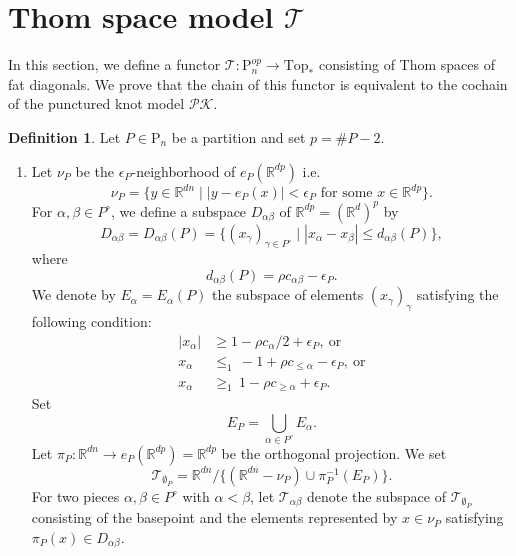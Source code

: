 \documentclass[reqno]{amsart}
\theoremstyle{definition}
\newtheorem{defi}{Definition}[section]
\theoremstyle{plain}
\newcommand{\eps}{\epsilon}
\newcommand{\TT}{\mathcal{T}} %
\newcommand{\PK}{\mathcal{PK}} %
\newcommand{\CG}{\mathrm{Top}}%
\newcommand{\RR}{\mathbb{R}}
\newcommand{\PP}{\mathrm{P}} %
\begin{document}
\section{Thom space model $\TT$}\label{SThom}
In this section, we define a functor $\TT:\PP_n^{op}\to \CG_*$ consisting of Thom spaces  of fat diagonals. We prove that the chain of this functor is  equivalent to the cochain of  the punctured knot model $\PK$. 

\begin{defi}\label{Dpartition} Let $P\in \PP_n$ be a partition and set $p=\# P-2$.
\begin{enumerate}




\item Let $\nu_{P}$ be the $\eps_P$-neighborhood of $e_P(\RR^{dp})$ i.e.
\[
\nu_P=\{y\in \RR^{dn}\mid |y-e_P(x)|<\eps_P \text{ for some } x\in \RR^{dp}\}.
\]  For  $\alpha, \beta\in P^\circ$,  we define a   subspace $D_{\alpha\beta}$ of $\RR^{dp}=(\RR^d)^p$ by
\[
D_{\alpha\beta}=D_{\alpha\beta}(P)=\{(x_\gamma)_{\gamma \in P^\circ} \mid |x_\alpha-x_\beta|\leq d_{\alpha\beta}(P)\}, 
\]
where 
\[
d_{\alpha\beta}(P)=\rho c_{\alpha \beta}-\eps_P.
\]
We denote by $E_{\alpha}=E_\alpha(P)$  the subspace of  elements $(x_\gamma)_\gamma$ satisfying the following condition:
\[
\begin{split}
|x_\alpha|& \geq 1-\rho c_\alpha/2+\eps_P,\  \text{or} \\
  x_\alpha&\leq_1\, -1+\rho c_{\leq \alpha}-\eps_P,\  \text{or} \\  x_\alpha&\geq_1\,  1-\rho c_{\geq \alpha}+\eps_P.
\end{split}
\] 
Set 
\[
E_P=\bigcup_{\alpha\in P^\circ}E_\alpha.
\] 
Let $\pi_P:\RR^{dn}\to e_P(\RR^{dp})=\RR^{dp}$ be the orthogonal projection. 
We set
\[
\TT_{\emptyset_P}=\RR^{dn}/\{(\RR^{dn}-\nu_P)\cup \pi_P^{-1}(E_P)\}.
\]
 For two pieces $\alpha, \beta\in P^\circ$ with $\alpha<\beta$, let $\TT_{\alpha\beta}$ denote the subspace of $\TT_{\emptyset_P}$ consisting of the basepoint and the elements represented by  $x\in \nu_P$ satisfying $\pi_P(x)\in D_{\alpha\beta}$.

\end{enumerate}
\end{defi}
\end{document}
